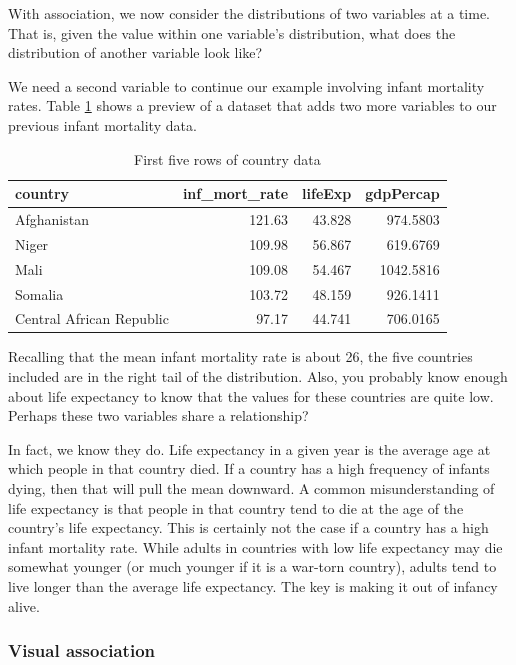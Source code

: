 \documentclass[
]{book}
\begin{document}
With association, we now consider the distributions of two variables at a time. That is, given the value within one variable's distribution, what does the distribution of another variable look like?

We need a second variable to continue our example involving infant mortality rates. Table \ref{tab:gapdeathtab} shows a preview of a dataset that adds two more variables to our previous infant mortality data.

\begin{table}

\caption{\label{tab:gapdeathtab}First five rows of country data}
\centering
\begin{tabular}[t]{l|r|r|r}
\hline
country & inf\_mort\_rate & lifeExp & gdpPercap\\
\hline
Afghanistan & 121.63 & 43.828 & 974.5803\\
\hline
Niger & 109.98 & 56.867 & 619.6769\\
\hline
Mali & 109.08 & 54.467 & 1042.5816\\
\hline
Somalia & 103.72 & 48.159 & 926.1411\\
\hline
Central African Republic & 97.17 & 44.741 & 706.0165\\
\hline
\end{tabular}
\end{table}

Recalling that the mean infant mortality rate is about 26, the five countries included are in the right tail of the distribution. Also, you probably know enough about life expectancy to know that the values for these countries are quite low. Perhaps these two variables share a relationship?

In fact, we know they do. Life expectancy in a given year is the average age at which people in that country died. If a country has a high frequency of infants dying, then that will pull the mean downward. A common misunderstanding of life expectancy is that people in that country tend to die at the age of the country's life expectancy. This is certainly not the case if a country has a high infant mortality rate. While adults in countries with low life expectancy may die somewhat younger (or much younger if it is a war-torn country), adults tend to live longer than the average life expectancy. The key is making it out of infancy alive.

\hypertarget{visual-association}{%
\subsubsection*{Visual association}\label{visual-association}}
\end{document}
